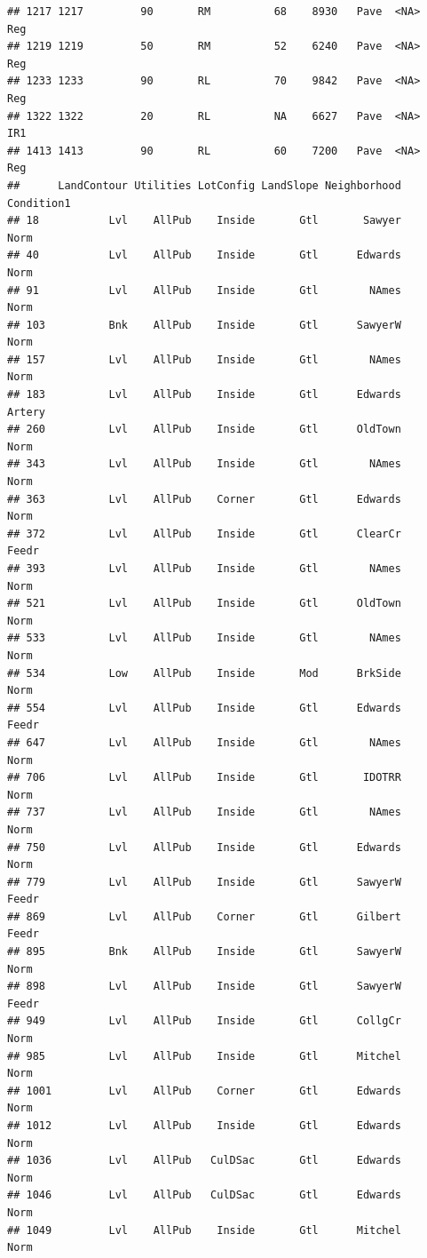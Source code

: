 \documentclass[]{article}
\begin{document}
\begin{verbatim}
## 1217 1217         90       RM          68    8930   Pave  <NA>      Reg
## 1219 1219         50       RM          52    6240   Pave  <NA>      Reg
## 1233 1233         90       RL          70    9842   Pave  <NA>      Reg
## 1322 1322         20       RL          NA    6627   Pave  <NA>      IR1
## 1413 1413         90       RL          60    7200   Pave  <NA>      Reg
##      LandContour Utilities LotConfig LandSlope Neighborhood Condition1
## 18           Lvl    AllPub    Inside       Gtl       Sawyer       Norm
## 40           Lvl    AllPub    Inside       Gtl      Edwards       Norm
## 91           Lvl    AllPub    Inside       Gtl        NAmes       Norm
## 103          Bnk    AllPub    Inside       Gtl      SawyerW       Norm
## 157          Lvl    AllPub    Inside       Gtl        NAmes       Norm
## 183          Lvl    AllPub    Inside       Gtl      Edwards     Artery
## 260          Lvl    AllPub    Inside       Gtl      OldTown       Norm
## 343          Lvl    AllPub    Inside       Gtl        NAmes       Norm
## 363          Lvl    AllPub    Corner       Gtl      Edwards       Norm
## 372          Lvl    AllPub    Inside       Gtl      ClearCr      Feedr
## 393          Lvl    AllPub    Inside       Gtl        NAmes       Norm
## 521          Lvl    AllPub    Inside       Gtl      OldTown       Norm
## 533          Lvl    AllPub    Inside       Gtl        NAmes       Norm
## 534          Low    AllPub    Inside       Mod      BrkSide       Norm
## 554          Lvl    AllPub    Inside       Gtl      Edwards      Feedr
## 647          Lvl    AllPub    Inside       Gtl        NAmes       Norm
## 706          Lvl    AllPub    Inside       Gtl       IDOTRR       Norm
## 737          Lvl    AllPub    Inside       Gtl        NAmes       Norm
## 750          Lvl    AllPub    Inside       Gtl      Edwards       Norm
## 779          Lvl    AllPub    Inside       Gtl      SawyerW      Feedr
## 869          Lvl    AllPub    Corner       Gtl      Gilbert      Feedr
## 895          Bnk    AllPub    Inside       Gtl      SawyerW       Norm
## 898          Lvl    AllPub    Inside       Gtl      SawyerW      Feedr
## 949          Lvl    AllPub    Inside       Gtl      CollgCr       Norm
## 985          Lvl    AllPub    Inside       Gtl      Mitchel       Norm
## 1001         Lvl    AllPub    Corner       Gtl      Edwards       Norm
## 1012         Lvl    AllPub    Inside       Gtl      Edwards       Norm
## 1036         Lvl    AllPub   CulDSac       Gtl      Edwards       Norm
## 1046         Lvl    AllPub   CulDSac       Gtl      Edwards       Norm
## 1049         Lvl    AllPub    Inside       Gtl      Mitchel       Norm

\end{verbatim}
\end{document}
